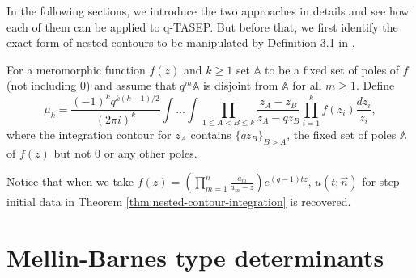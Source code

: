 In the following sections, we introduce the two approaches in details and see how each of them can be applied to q-TASEP. But before that, we first identify the exact form of nested contours to be manipulated by Definition 3.1 in \cite{macdonald2014}.

\begin{definition}
\label{mu_k_def}
For a meromorphic function $f(z)$ and $k \ge 1$ set $\mathbb{A}$ to be a fixed set of poles of $f$ (not including 0) and assume that $q^m \mathbb{A}$ is disjoint from $\mathbb{A}$ for all $m \ge 1$. Define
$$\mu_k = \frac{(-1)^k q^{k(k-1)/2}}{(2 \pi i)^k} \int \dots \int \prod_{1 \le A < B \le k} \frac{z_A - z_B} {z_A - qz_B} \prod_{i=1}^k f(z_i) \frac{dz_i}{z_i},$$ where the integration contour for $z_A$ contains $\{qz_B\}_{B > A}$, the fixed set of poles $\mathbb{A}$ of $f(z)$ but not $0$ or any other poles. 
\end{definition}

Notice that when we take $f(z) = \left( \prod_{m=1}^{n} \frac{a_m}{a_m - z} \right) e^{(q-1)tz}$, $u(t;\vec{n})$ for step initial data in Theorem \ref{thm:nested-contour-integration} is recovered.

\section{Mellin-Barnes type determinants}

